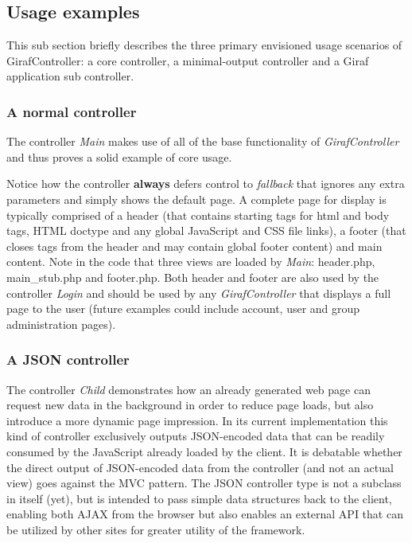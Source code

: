 \subsection{Usage examples}
This sub section briefly describes the three primary envisioned usage scenarios of GirafController: a core controller, a minimal-output controller and a Giraf application sub controller.

\subsubsection*{A normal controller}
The controller \emph{Main} makes use of all of the base functionality of \emph{GirafController} and thus proves a solid example of core usage.



Notice how the controller \textbf{always} defers control to \emph{fallback} that ignores any extra parameters and simply shows the default page. A complete page for display is typically comprised of a header (that contains starting tags for html and body tags, HTML doctype and any global JavaScript and CSS file links), a footer (that closes tags from the header and may contain global footer content) and main content. Note in the code that three views are loaded by \emph{Main}: header.php, main\_stub.php and footer.php. Both header and footer are also used by the controller \emph{Login} and should be used by any \emph{GirafController} that displays a full page to the user (future examples could include account, user and group administration pages).

\subsubsection*{A JSON controller}


The controller \emph{Child} demonstrates how an already generated web page can request new data in the background in order to reduce page loads, but also introduce a more dynamic page impression. In its current implementation this kind of controller exclusively outputs JSON-encoded data that can be readily consumed by the JavaScript already loaded by the client. It is debatable whether the direct output of JSON-encoded data from the controller (and not an actual view) goes against the MVC pattern.
The JSON controller type is not a subclass in itself (yet), but is intended to pass simple data structures back to the client, enabling both AJAX from the browser but also enables an external API that can be utilized by other sites for greater utility of the framework.

